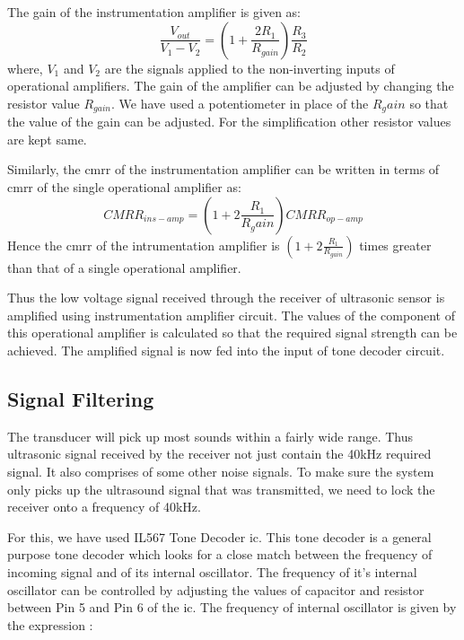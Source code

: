 

The gain of the instrumentation amplifier is given as:
\begin{equation}
	\frac{V_{out}}{V_1-V_2}=(1+\frac{2R_1}{R_{gain}})\frac{R_3}{R_2}
\end{equation}
where, $V_1$ and $V_2$ are the signals applied to the non-inverting inputs of operational amplifiers. The gain of the amplifier can be adjusted by changing the resistor value $R_{gain}$. We have used a potentiometer in place of the $R_gain$ so that the value of the gain can be adjusted. For the simplification other resistor values are kept same. 

Similarly, the \gls{cmrr} of the instrumentation amplifier can be written in terms of \gls{cmrr} of the single operational amplifier as:
\begin{equation}
	CMRR_{ins-amp}=(1+2\frac{R_1}{R_gain})CMRR_{op-amp} \nonumber
\end{equation}
Hence the \gls{cmrr} of the intrumentation amplifier is $(1+2\frac{R_1}{R_{gain}})$ times greater than that of a single operational amplifier.

	
Thus the low voltage signal received through the receiver of ultrasonic sensor is amplified using instrumentation amplifier circuit. The values of the component of this operational amplifier is calculated so that the required signal strength can be achieved. The amplified signal is now fed into the input of tone decoder circuit.


\subsection{Signal Filtering}

The transducer will pick up most sounds within a fairly wide range. Thus ultrasonic signal received by the receiver not just contain the 40kHz required signal. It also comprises of some other noise signals. To make sure the system only picks up the ultrasound signal that was transmitted, we need to lock the receiver onto a frequency of 40kHz. 

For this, we have used IL567 Tone Decoder \gls{ic}. This tone decoder is a general purpose tone decoder which looks for a close match between the frequency of incoming signal and of its internal oscillator. The frequency of it's internal oscillator can be controlled by adjusting the values of capacitor and resistor between Pin 5 and Pin 6 of the \gls{ic}. The frequency of internal oscillator is given by the expression :\cite{Yichao}

